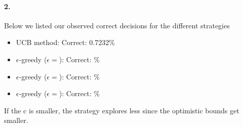 \paragraph{2.}
Below we listed our observed correct decisions for the different strategies
\begin{itemize}
    \item UCB method: Correct: 0.7232\%
    \item $\epsilon$-greedy ($\epsilon=$): Correct: \%
    \item $\epsilon$-greedy ($\epsilon=$): Correct: \%
    \item $\epsilon$-greedy ($\epsilon=$): Correct: \%
\end{itemize}
If the c is smaller, the strategy explores less since the optimistic bounds
get smaller.
